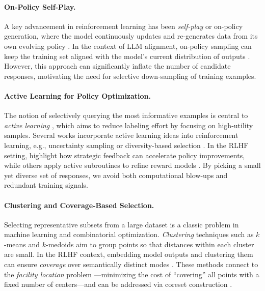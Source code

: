 \paragraph{On-Policy Self-Play.}
A key advancement in reinforcement learning has been \emph{self-play} or on-policy generation, where the model continuously updates and re-generates data from its own evolving policy \citep{silver2016mastering, silver2017mastering}. In the context of LLM alignment, on-policy sampling can keep the training set aligned with the model’s current distribution of outputs \citep{christiano2017deep, wu2023fine}. However, this approach can significantly inflate the number of candidate responses, motivating the need for selective down-sampling of training examples.

\paragraph{Active Learning for Policy Optimization.}
The notion of selectively querying the most informative examples is central to \emph{active learning} \citep{cohn1996active, settles2009active}, which aims to reduce labeling effort by focusing on high-utility samples. Several works incorporate active learning ideas into reinforcement learning, e.g., uncertainty sampling or diversity-based selection \citep{sener2017active, zhang2022active}. In the RLHF setting, \citet{christiano2017deep} highlight how strategic feedback can accelerate policy improvements, while others apply active subroutines to refine reward models \citep{wu2023fine}. By picking a small yet diverse set of responses, we avoid both computational blow-ups and redundant training signals.

\paragraph{Clustering and Coverage-Based Selection.}
Selecting representative subsets from a large dataset is a classic problem in machine learning and combinatorial optimization. \emph{Clustering} techniques such as $k$-means and $k$-medoids \citep{hartigan1979algorithm} aim to group points so that distances within each cluster are small. In the RLHF context, embedding model outputs and clustering them can ensure \emph{coverage} over semantically distinct modes \citep{har2004coresets, cohen2022improved}. These methods connect to the \emph{facility location} problem \citep{oh2017deep}—minimizing the cost of “covering” all points with a fixed number of centers—and can be addressed via coreset construction \citep{feldman2020core}. 

